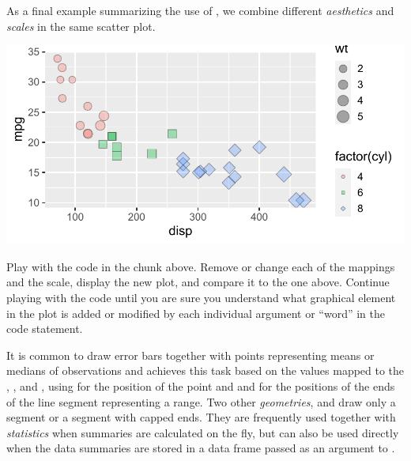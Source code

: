 \documentclass[krantz2]{krantz}\usepackage{knitr}
\begin{document}

As a final example summarizing the use of , we combine different \emph{aesthetics} and \emph{scales} in the same scatter plot.

\begin{knitrout}\footnotesize
{}\color{fgcolor}\begin{kframe}
\begin{alltt}
\hlstd{(}  \hlstd{(}   
                           \hlstd{=} 
                           \hlstd{=} 
                            \hlopt{+}
  \hlstd{(} \hlstd{=} \hlstd{,}  \hlstd{=} \hlstd{)} \hlopt{+}
  \hlstd{()} \hlopt{+}
  \hlstd{(} \hlstd{=} \hlstd{(}\hlstd{,} \hlstd{,} \hlstd{))}
\end{alltt}
\end{kframe}

{\centering \includegraphics[width=.7\textwidth]{figure/pos-scatter-18-1} 

}


\end{knitrout}

\begin{playground}
Play with the code in the chunk above. Remove or change each of the mappings and the scale, display the new plot, and compare it to the one above. Continue playing with the code until you are sure you understand what graphical element in the plot is added or modified by each individual argument or ``word'' in the code statement.
\end{playground}

It is common to draw error bars together with points representing means or medians of observations and  achieves this task based on the values mapped to the , ,  and , using  for the position of the point and  and  for the positions of the ends of the line segment representing a range. Two other \emph{geometries},  and   draw only a segment or a segment with capped ends. They are frequently used together with \emph{statistics} when summaries are calculated on the fly, but can also be used directly when the data summaries are stored in a data frame passed as an argument to .
\end{document}
